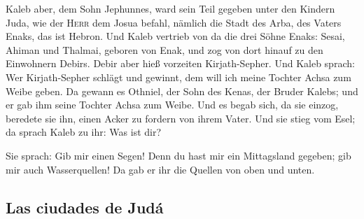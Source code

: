  Kaleb aber, dem Sohn Jephunnes, ward sein Teil gegeben
unter den Kindern Juda, wie der \textsc{Herr} dem Josua befahl, nämlich
die Stadt des Arba, des Vaters Enaks, das ist Hebron. 
Und Kaleb vertrieb von da die drei Söhne Enaks: Sesai, Ahiman und
Thalmai, geboren von Enak,  und zog von dort hinauf zu
den Einwohnern Debirs. Debir aber hieß vorzeiten Kirjath-Sepher.
 Und Kaleb sprach: Wer Kirjath-Sepher schlägt und
gewinnt, dem will ich meine Tochter Achsa zum Weibe geben.
 Da gewann es Othniel, der Sohn des Kenas, der Bruder
Kalebs; und er gab ihm seine Tochter Achsa zum Weibe. 
Und es begab sich, da sie einzog, beredete sie ihn, einen Acker zu
fordern von ihrem Vater. Und sie stieg vom Esel; da sprach Kaleb zu ihr:
Was ist dir?

 Sie sprach: Gib mir einen Segen! Denn du hast mir ein
Mittagsland gegeben; gib mir auch Wasserquellen! Da gab er ihr die
Quellen von oben und unten.

\hypertarget{las-ciudades-de-juduxe1}{%
\subsection{Las ciudades de Judá}\label{las-ciudades-de-juduxe1}}

